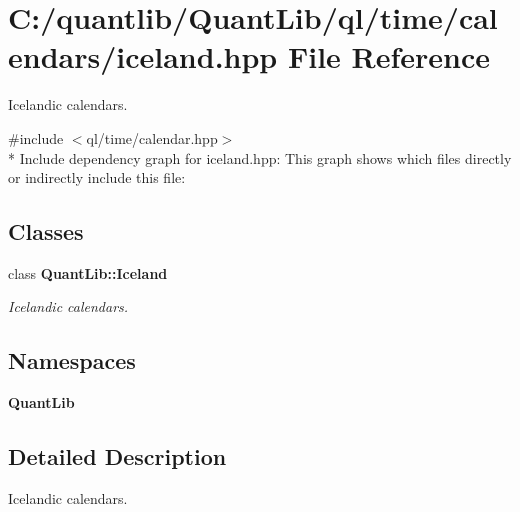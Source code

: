 \section{C\+:/quantlib/\+Quant\+Lib/ql/time/calendars/iceland.hpp File Reference}
\label{iceland_8hpp}


Icelandic calendars.  


{\ttfamily \#include $<$ql/time/calendar.\+hpp$>$}\\*
Include dependency graph for iceland.\+hpp\+:
This graph shows which files directly or indirectly include this file\+:
\subsection*{Classes}
\begin{DoxyCompactItemize}
\item 
class {\bf Quant\+Lib\+::\+Iceland}
\begin{DoxyCompactList}\small\item\em Icelandic calendars. \end{DoxyCompactList}\end{DoxyCompactItemize}
\subsection*{Namespaces}
\begin{DoxyCompactItemize}
\item 
 {\bf Quant\+Lib}
\end{DoxyCompactItemize}


\subsection{Detailed Description}
Icelandic calendars. 

